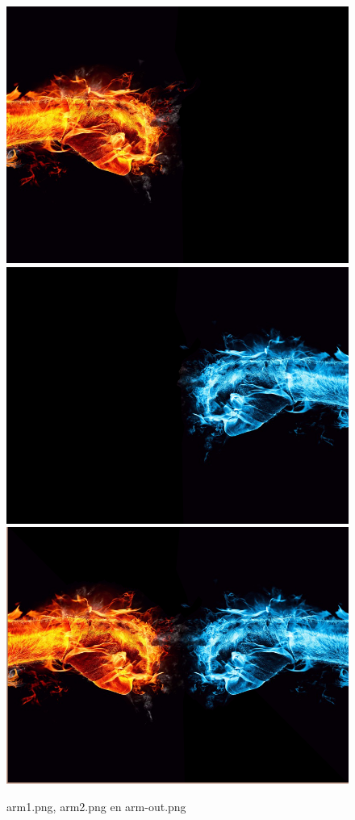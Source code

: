 \documentclass{article}
\begin{document}
\begin{figure}[h!]
\centering
\includegraphics[scale=0.2]{arm1.png}
\includegraphics[scale=0.2]{arm2.png}
\includegraphics[scale=0.2]{arm-out.png}
\caption{arm1.png, arm2.png en arm-out.png}
\label{fig:Arm}
\end{figure}
\end{document}
